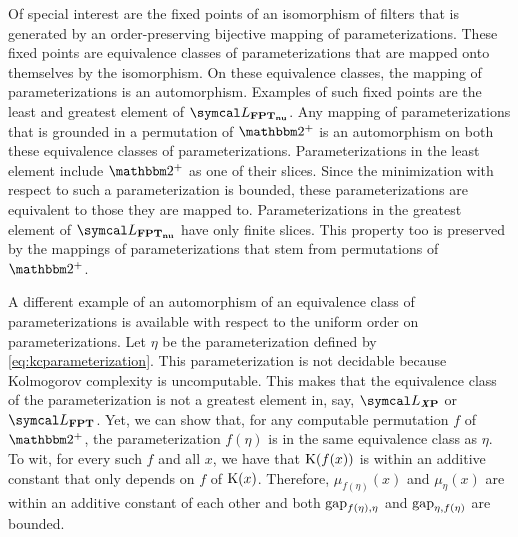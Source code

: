 Of special interest are the fixed points of an isomorphism of filters that is generated by an order-preserving bijective mapping of parameterizations.
These fixed points are equivalence classes of parameterizations that are mapped onto themselves by the isomorphism.
On these equivalence classes, the mapping of parameterizations is an automorphism.
Examples of such fixed points are the least and greatest element of $\calL_\clnu{FPT}$.
Any mapping of parameterizations that is grounded in a permutation of $\binary^+$ is an automorphism on both these equivalence classes of parameterizations.
Parameterizations in the least element include $\binary^+$ as one of their slices.
Since the minimization with respect to such a parameterization is bounded, these parameterizations are equivalent to those they are mapped to.
Parameterizations in the greatest element of $\calL_\clnu{FPT}$ have only finite slices.
This property too is preserved by the mappings of parameterizations that stem from permutations of $\binary^+$.
\begin{example}
  A different example of an automorphism of an equivalence class of parameterizations is available with respect to the uniform order on parameterizations.
  Let $\eta$ be the parameterization defined by \eqref{eq:kcparameterization}.
  This parameterization is not decidable because Kolmogorov complexity is uncomputable.
  This makes that the equivalence class of the parameterization is not a greatest element in, say, $\calL_\clX{P}$ or $\calL_\cl{FPT}$.
  Yet, we can show that, for any computable permutation $f$ of $\binary^+$, the parameterization $f(\eta)$ is in the same equivalence class as $\eta$.
  To wit, for every such $f$ and all $x$, we have that $\operatorname{K}(f(x))$ is within an additive constant that only depends on $f$ of $\operatorname{K}(x)$.
  Therefore, $\mu_{f(\eta)}(x)$ and $\mu_\eta(x)$ are within an additive constant of each other and both $\operatorname{gap}_{f(\eta), \eta}$ and $\operatorname{gap}_{\eta, f(\eta)}$ are bounded.
\end{example}


